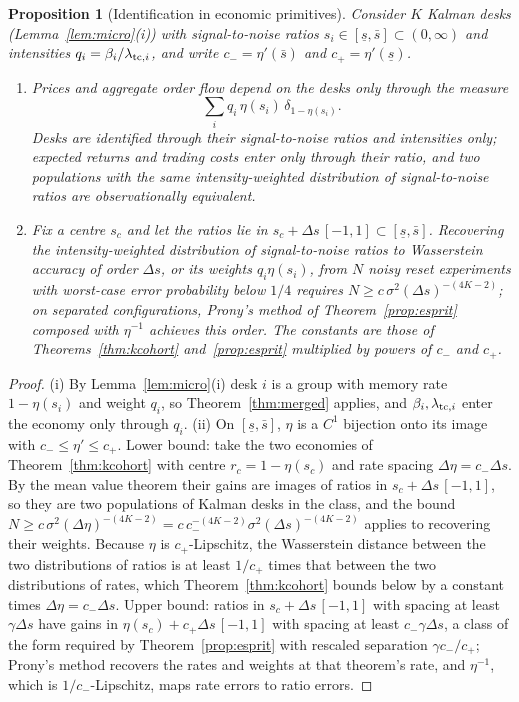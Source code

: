 \documentclass[12pt]{article}
\newtheorem{proposition}[theorem]{Proposition}
\theoremstyle{definition}
\theoremstyle{remark}
\begin{document}
\begin{proposition}[Identification in economic primitives]\label{prop:primitives}
Consider $K$ Kalman desks (Lemma~\ref{lem:micro}(i)) with signal-to-noise ratios $s_i\in[\underline s,\bar s]\subset(0,\infty)$ and intensities $q_i=\beta_i/\lambda_{{\rm tc},i}$, and write $c_-=\eta'(\bar s)$ and $c_+=\eta'(\underline s)$.
\begin{enumerate}[label=(\roman*)]
\item Prices and aggregate order flow depend on the desks only through the measure
\[
\sum_iq_i\,\eta(s_i)\,\delta_{1-\eta(s_i)}.
\]
Desks are identified through their signal-to-noise ratios and intensities only; expected returns and trading costs enter only through their ratio, and two populations with the same intensity-weighted distribution of signal-to-noise ratios are observationally equivalent.
\item Fix a centre $s_c$ and let the ratios lie in $s_c+\Delta s\,[-1,1]\subset[\underline s,\bar s]$. Recovering the intensity-weighted distribution of signal-to-noise ratios to Wasserstein accuracy of order $\Delta s$, or its weights $q_i\eta(s_i)$, from $N$ noisy reset experiments with worst-case error probability below $1/4$ requires $N\ge c\,\sigma^2(\Delta s)^{-(4K-2)}$; on separated configurations, Prony's method of Theorem~\ref{prop:esprit} composed with $\eta^{-1}$ achieves this order. The constants are those of Theorems~\ref{thm:kcohort} and~\ref{prop:esprit} multiplied by powers of $c_-$ and $c_+$.
\end{enumerate}
\end{proposition}

\begin{proof}
(i) By Lemma~\ref{lem:micro}(i) desk $i$ is a group with memory rate $1-\eta(s_i)$ and weight $q_i$, so Theorem~\ref{thm:merged} applies, and $\beta_i,\lambda_{{\rm tc},i}$ enter the economy only through $q_i$. (ii) On $[\underline s,\bar s]$, $\eta$ is a $C^1$ bijection onto its image with $c_-\le\eta'\le c_+$. Lower bound: take the two economies of Theorem~\ref{thm:kcohort} with centre $r_c=1-\eta(s_c)$ and rate spacing $\Delta\eta=c_-\Delta s$. By the mean value theorem their gains are images of ratios in $s_c+\Delta s\,[-1,1]$, so they are two populations of Kalman desks in the class, and the bound $N\ge c\,\sigma^2(\Delta\eta)^{-(4K-2)}=c\,c_-^{-(4K-2)}\sigma^2(\Delta s)^{-(4K-2)}$ applies to recovering their weights. Because $\eta$ is $c_+$-Lipschitz, the Wasserstein distance between the two distributions of ratios is at least $1/c_+$ times that between the two distributions of rates, which Theorem~\ref{thm:kcohort} bounds below by a constant times $\Delta\eta=c_-\Delta s$. Upper bound: ratios in $s_c+\Delta s\,[-1,1]$ with spacing at least $\gamma\Delta s$ have gains in $\eta(s_c)+c_+\Delta s\,[-1,1]$ with spacing at least $c_-\gamma\Delta s$, a class of the form required by Theorem~\ref{prop:esprit} with rescaled separation $\gamma c_-/c_+$; Prony's method recovers the rates and weights at that theorem's rate, and $\eta^{-1}$, which is $1/c_-$-Lipschitz, maps rate errors to ratio errors.
\end{proof}
\end{document}
